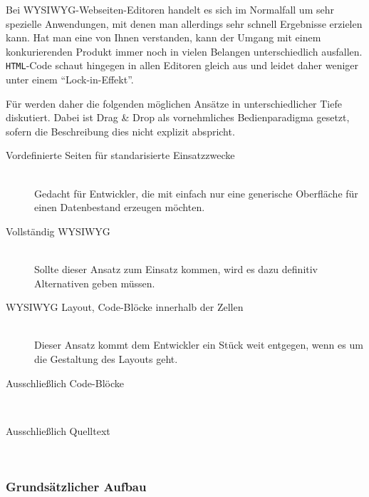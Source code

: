 Bei WYSIWYG-Webseiten-Editoren handelt es sich im Normalfall um sehr spezielle Anwendungen, mit denen man allerdings sehr schnell Ergebnisse erzielen kann. Hat man eine von Ihnen verstanden, kann der Umgang mit einem konkurierenden Produkt immer noch in vielen Belangen unterschiedlich ausfallen. \texttt{HTML}-Code schaut hingegen in allen Editoren gleich aus und leidet daher weniger unter einem "`Lock-in-Effekt"'.

Für \idename{} werden daher die folgenden möglichen Ansätze in unterschiedlicher Tiefe diskutiert. Dabei ist Drag \& Drop als vornehmliches Bedienparadigma gesetzt, sofern die Beschreibung dies nicht explizit abspricht.

\begin{description}
\item[Vordefinierte Seiten für standarisierte Einsatzzwecke] \hfill \\
  Gedacht für Entwickler, die mit \idename{} einfach nur eine generische Oberfläche für einen Datenbestand erzeugen möchten.
  
\item[Vollständig WYSIWYG] \hfill \\
  Sollte dieser Ansatz zum Einsatz kommen, wird es dazu definitiv Alternativen geben müssen.
  
\item[WYSIWYG Layout, Code-Blöcke innerhalb der Zellen] \hfill \\
  Dieser Ansatz kommt dem Entwickler ein Stück weit entgegen, wenn es um die Gestaltung des Layouts geht.
  
\item[Ausschließlich Code-Blöcke] \hfill \\
  
\item[Ausschließlich Quelltext] \hfill \\
  
\end{description}

\subsubsection{Grundsätzlicher Aufbau}
\label{sec:design-ui-editor}


